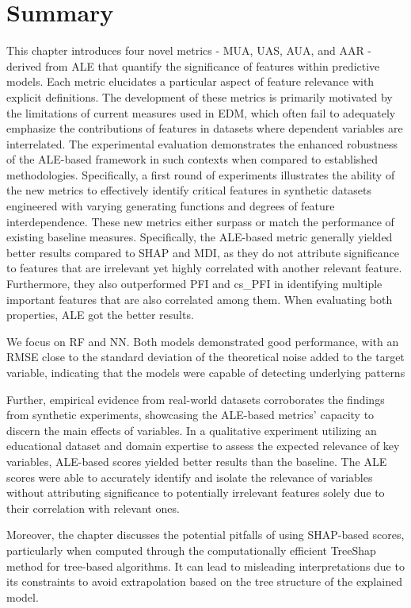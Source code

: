 \section{Summary}

This chapter introduces four novel metrics - MUA, UAS, AUA,  and AAR - derived from ALE that quantify the significance of features within predictive models. Each metric elucidates a particular aspect of feature relevance with explicit definitions. The development of these metrics is primarily motivated by the limitations of current measures used in EDM, which often fail to adequately emphasize the contributions of features in datasets where dependent variables are interrelated. The experimental evaluation demonstrates the enhanced robustness of the ALE-based framework in such contexts when compared to established methodologies. Specifically, a first round of experiments illustrates the ability of the new metrics to effectively identify critical features in synthetic datasets engineered with varying generating functions and degrees of feature interdependence. These new metrics either surpass or match the performance of existing baseline measures. Specifically, the ALE-based metric generally yielded better results compared to SHAP and MDI, as they do not attribute significance to features that are irrelevant yet highly correlated with another relevant feature. Furthermore, they also outperformed PFI and cs\_PFI in identifying multiple important features that are also correlated among them. When evaluating both properties, ALE got the better results.  

We focus on RF and NN. Both models demonstrated good performance, with an RMSE close to the standard deviation of the theoretical noise added to the target variable, indicating that the models were capable of detecting underlying patterns

Further, empirical evidence from real-world datasets corroborates the findings from synthetic experiments, showcasing the ALE-based metrics' capacity to discern the main effects of variables. In a qualitative experiment utilizing an educational dataset and domain expertise to assess the expected relevance of key variables, ALE-based scores yielded better results than the baseline. The ALE scores were able to accurately identify and isolate the relevance of variables without attributing significance to potentially irrelevant features solely due to their correlation with relevant ones.

Moreover, the chapter discusses the potential pitfalls of using SHAP-based scores, particularly when computed through the computationally efficient TreeShap method for tree-based algorithms. It can lead to misleading interpretations due to its constraints to avoid extrapolation based on the tree structure of the explained model.


